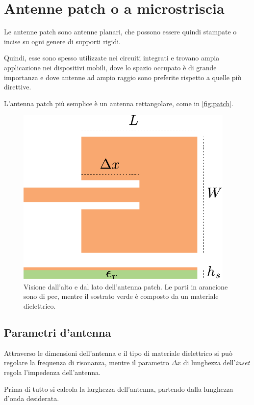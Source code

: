 \chapter{Antenne patch o a microstriscia}
Le antenne patch sono antenne planari, che possono essere quindi stampate o incise su ogni genere di supporti rigidi.

Quindi, esse sono spesso utilizzate nei circuiti integrati e trovano ampia applicazione nei dispositivi mobili, dove lo spazio occupato è di grande importanza e dove antenne ad ampio raggio sono preferite rispetto a quelle più direttive.

L'antenna patch più semplice è un antenna rettangolare, come in \autoref{fig:patch}.

\begin{figure}[htp]
	\centering
	\includegraphics[]{img/patch.pdf}
	\caption{Visione dall'alto e dal lato dell'antenna patch. Le parti in arancione sono di \gls{pec}, mentre il sostrato verde è composto da un materiale dielettrico.}
	\label{fig:patch}
\end{figure}

\section{Parametri d'antenna}

Attraverso le dimensioni dell'antenna e il tipo di materiale dielettrico si può regolare la frequenza di risonanza, mentre il parametro $\Delta x$ di lunghezza dell'\emph{inset} regola l'impedenza dell'antenna.

Prima di tutto si calcola la larghezza dell'antenna, partendo dalla lunghezza d'onda desiderata.

